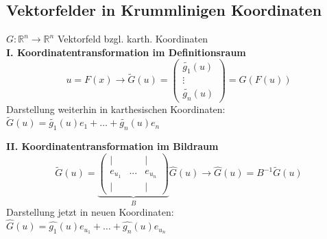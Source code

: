 \subsection{Vektorfelder in Krummlinigen Koordinaten}
$G:\mathbb R^n \rightarrow \mathbb R^n$ Vektorfeld bzgl. karth. Koordinaten \\
\textbf{I. Koordinatentransformation im Definitionsraum} \\
\begin{equation*}
    u=F(x) \rightarrow \tilde{G}(u)=\begin{pmatrix}
        \tilde{g_1}(u) \\ \vdots \\ \tilde{g_n}(u)
    \end{pmatrix}=G(F(u))
\end{equation*}
Darstellung weiterhin in karthesischen Koordinaten: \\
$\tilde{G}(u)=\tilde{g_1}(u)e_1 + \dots + \tilde{g_n}(u)e_n$

\textbf{II. Koordinatentransformation im Bildraum} \\
\begin{equation*}
    \tilde{G}(u)=\underbrace{\begin{pmatrix}
            |       &     & |       \\
            e_{u_1} & ... & e_{u_n} \\
            |       &     & |
        \end{pmatrix}}_{B}\hat{G}(u) \rightarrow \hat{G}(u)=B^{-1}\tilde{G}(u)
\end{equation*}
Darstellung jetzt in neuen Koordinaten: \\
$\hat{G}(u)=\hat{g_1}(u)e_{u_1} + \dots + \hat{g_n}(u)e_{u_n}$